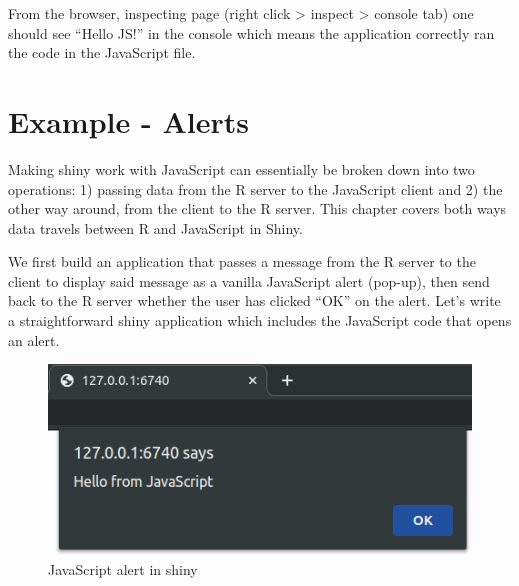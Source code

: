\documentclass[
]{krantz}
\makeatletter
\newenvironment{Shaded}{\begin{snugshade}}{\end{snugshade}}
\newcommand{\ControlFlowTok}[1]{\textcolor[rgb]{0.27,0.27,0.27}{\textbf{#1}}}
\newcommand{\KeywordTok}[1]{\textcolor[rgb]{0.27,0.27,0.27}{\textbf{#1}}}
\newcommand{\NormalTok}[1]{#1}
\newcommand{\OperatorTok}[1]{\textcolor[rgb]{0.43,0.43,0.43}{\textbf{#1}}}
\newcommand{\StringTok}[1]{\textcolor[rgb]{0.5,0.5,0.5}{#1}}
\newenvironment{kframe}{%
\medskip{}
\setlength{\fboxsep}{.8em}
 \def\at@end@of@kframe{}%
 \ifinner\ifhmode%
  \def\at@end@of@kframe{\end{minipage}}%
  \begin{minipage}{\columnwidth}%
 \fi\fi%
 \def\FrameCommand##1{\hskip\@totalleftmargin \hskip-\fboxsep
 \colorbox{shadecolor}{##1}\hskip-\fboxsep
     \hskip-\linewidth \hskip-\@totalleftmargin \hskip\columnwidth}%
 \MakeFramed {\advance\hsize-\width
   \@totalleftmargin\z@ \linewidth\hsize
   \@setminipage}}%
 {\par\unskip\endMakeFramed%
 \at@end@of@kframe}
\renewenvironment{Shaded}{\begin{kframe}}{\end{kframe}}
\makeatother
\begin{document}
From the browser, inspecting page (right click \textgreater{} inspect \textgreater{} console tab) one should see ``Hello JS!'' in the console which means the application correctly ran the code in the JavaScript file.

\hypertarget{example---alerts}{%
\section*{Example - Alerts}\label{example---alerts}}


Making shiny work with JavaScript can essentially be broken down into two operations: 1) passing data from the R server to the JavaScript client and 2) the other way around, from the client to the R server. This chapter covers both ways data travels between R and JavaScript in Shiny.

We first build an application that passes a message from the R server to the client to display said message as a vanilla JavaScript alert (pop-up), then send back to the R server whether the user has clicked ``OK'' on the alert. Let's write a straightforward shiny application which includes the JavaScript code that opens an alert.

\begin{Shaded}
\end{Shaded}

\begin{figure}
\centering
\includegraphics{images/alert.png}
\caption{JavaScript alert in shiny}
\end{figure}
\end{document}
